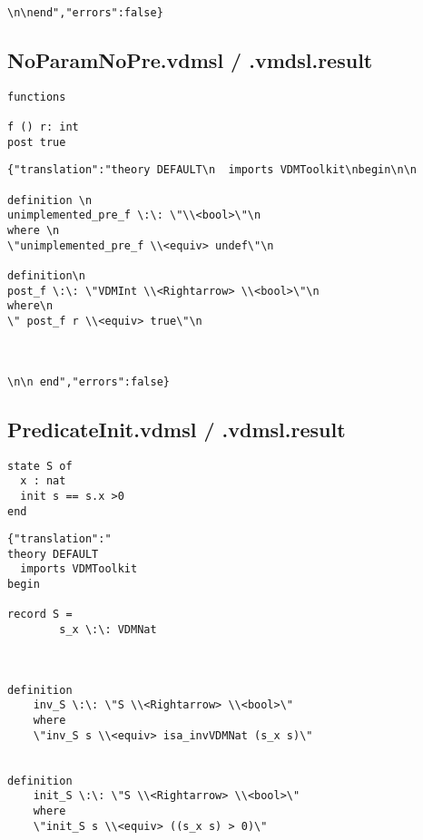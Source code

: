 \begin{appendices}
\begin{lstlisting}
\n\nend","errors":false}
\end{lstlisting}

\subsection{NoParamNoPre.vdmsl / .vmdsl.result}
\begin{lstlisting}
functions

f () r: int
post true
\end{lstlisting}

\begin{lstlisting}
{"translation":"theory DEFAULT\n  imports VDMToolkit\nbegin\n\n

definition \n
unimplemented_pre_f \:\: \"\\<bool>\"\n
where \n
\"unimplemented_pre_f \\<equiv> undef\"\n

definition\n
post_f \:\: \"VDMInt \\<Rightarrow> \\<bool>\"\n
where\n
\" post_f r \\<equiv> true\"\n



\n\n end","errors":false}
\end{lstlisting}

\subsection{PredicateInit.vdmsl / .vdmsl.result}
\begin{lstlisting}
state S of
  x : nat
  init s == s.x >0
end
\end{lstlisting}

\begin{lstlisting}
{"translation":"
theory DEFAULT
  imports VDMToolkit
begin

record S =
        s_x \:\: VDMNat

    

definition
    inv_S \:\: \"S \\<Rightarrow> \\<bool>\"
    where
    \"inv_S s \\<equiv> isa_invVDMNat (s_x s)\"


definition
    init_S \:\: \"S \\<Rightarrow> \\<bool>\"
    where
    \"init_S s \\<equiv> ((s_x s) > 0)\"



\end{lstlisting}
\end{appendices}

